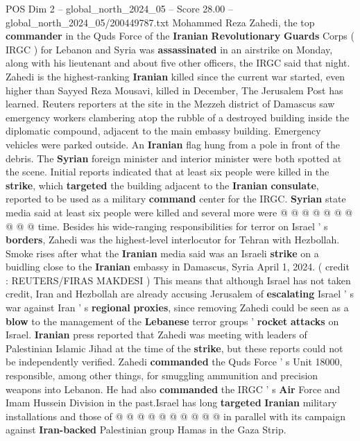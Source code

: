 \begin{textsample}{POS Dim 2 – global\_north\_2024\_05 – Score 28.00 – global\_north\_2024\_05/200449787.txt}  \label{ex:f2_pos_381}
Mohammed Reza Zahedi, the top \textbf{commander} in the Quds Force of the \textbf{Iranian} \textbf{Revolutionary} \textbf{Guards} Corps ( IRGC ) for Lebanon and Syria was \textbf{assassinated} in an airstrike on Monday, along with his lieutenant and about five other officers, the IRGC said that night.
Zahedi is the highest-ranking \textbf{Iranian} killed since the current war started, even higher than Sayyed Reza Mousavi, killed in December, The Jerusalem Post has learned.
Reuters reporters at the site in the Mezzeh district of Damascus saw emergency workers clambering atop the rubble of a destroyed building inside the diplomatic compound, adjacent to the main embassy building.
Emergency vehicles were parked outside.
An \textbf{Iranian} flag hung from a pole in front of the debris.
The \textbf{Syrian} foreign minister and interior minister were both spotted at the scene.
Initial reports indicated that at least six people were killed in the \textbf{strike}, which \textbf{targeted} the building adjacent to the \textbf{Iranian} \textbf{consulate}, reported to be used as a military \textbf{command} center for the IRGC. \textbf{Syrian} state media said at least six people were killed and several more were @ @ @ @ @ @ @ @ @ @ time.
Besides his wide-ranging responsibilities for terror on Israel ' s \textbf{borders}, Zahedi was the highest-level interlocutor for Tehran with Hezbollah.
Smoke rises after what the \textbf{Iranian} media said was an Israeli \textbf{strike} on a buidling close to the \textbf{Iranian} embassy in Damascus, Syria April 1, 2024. ( credit : REUTERS/FIRAS MAKDESI ) This means that although Israel has not taken credit, Iran and Hezbollah are already accusing Jerusalem of \textbf{escalating} Israel ' s war against Iran ' s \textbf{regional} \textbf{proxies}, since removing Zahedi could be seen as a \textbf{blow} to the management of the \textbf{Lebanese} terror groups ' \textbf{rocket} \textbf{attacks} on Israel. \textbf{Iranian} press reported that Zahedi was meeting with leaders of Palestinian Islamic Jihad at the time of the \textbf{strike}, but these reports could not be independently verified.
Zahedi \textbf{commanded} the Quds Force ' s Unit 18000, responsible, among other things, for smuggling ammunition and precision weapons into Lebanon.
He had also \textbf{commanded} the IRGC ' s \textbf{Air} Force and Imam Hussein Division in the past.Israel has long \textbf{targeted} \textbf{Iranian} military installations and those of @ @ @ @ @ @ @ @ @ @ in parallel with its campaign against \textbf{Iran-backed} Palestinian group Hamas in the Gaza Strip.

\end{textsample}
